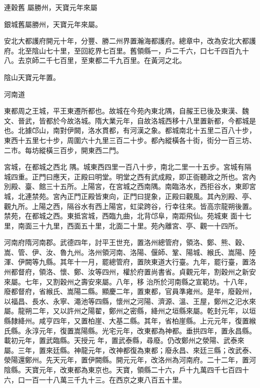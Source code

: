 \begin{pinyinscope}
 連穀舊
 屬勝州，天寶元年來屬



 銀城舊屬勝州，天寶元年來屬。



 安北大都護府開元十年，分豐、勝二州界置瀚海都護府。總章中，改為安北大都護府。北至陰山七十里，至回紇界七百里。舊領縣一，戶二千六，口七千四百九十八。去京師二千七百里，至東都二千九百里。在黃河之北。



 陰山天寶元年置。



 河南道



 東都周之王城，平王東遷所都也。故城在今苑內東北隅，自赧王已後及東漢、魏文、晉武，皆都於今故洛城。隋大業元年，自故洛城西移十八里置新都，今都城是也。北據邙山，南對伊闕，洛水貫都，有河漢之象。都城南北十五里二百八十步，東西十五里七十步，周圍六十九里三百二十步。都內縱橫各十街，街分一百三坊、二市。每坊縱橫三百步，開東西二門。



 宮城，在都城之西北
 隅。城東西四里一百八十步，南北二里一十五步。宮城有隔城四重。正門曰應天，正殿曰明堂。明堂之西有武成殿，即正衙聽政之所也。宮內別殿、臺、館三十五所。上陽宮，在宮城之西南隅。南臨洛水，西拒谷水，東即宮城，北連禁苑。宮內正門正殿皆東向，正門曰提象，正殿曰觀風。其內別殿、亭、觀九所。上陽之西，隔谷水有西上陽宮，虹梁跨谷，行幸往來。皆高宗龍朔後置。禁苑，在都城之西。東抵宮城，西臨九曲，北背邙阜，南距飛仙。苑城東
 面十七里，南面三十九里，西面五十里，北面二十里。苑內離宮、亭、觀一十四所。



 河南府隋河南郡。武德四年，討平王世充，置洛州總管府，領洛、鄭、熊、穀、嵩、管、伊、汝、魯九州。洛州領河南、洛陽、偃師、鞏、陽城、緱氏、嵩陽、陸渾、伊闕等九縣。其年十一月，罷總管府，置陜東道大行臺。九年，罷行臺，置洛州都督府，領洛、懷、鄭、汝等四州，權於府置尚書省。貞觀元年，割穀州之新安來屬。七年，又割穀州之壽安來屬。八年，移
 治所於河南縣之宣範坊。十八年，廢都督府，省緱氏、嵩陽二縣。顯慶二年，置東都，官員準雍州。是年，廢穀州，以福昌、長水、永寧、澠池等四縣，懷州之河陽、濟源、溫、王屋，鄭州之汜水來屬。龍朔二年，又以許州之陽翟，鄭州之密縣，絳州之垣縣來屬。乾封元年，以垣縣隸絳州。咸亨四年，又置柏崖、大基二縣。其年，省柏崖縣。上元元年，復置緱氏縣。永淳元年，復置嵩陽縣。光宅元年，改東都為神都。垂拱四年，置永昌縣。載初元年，置武臨縣。天授元
 年，置武泰縣，尋廢。仍改鄭州之滎陽、武泰來屬。三年，置來廷縣。神龍元年，改神都復為東都；廢永昌、來廷三縣；改武泰、滎陽還鄭州。先天元年，置伊闕縣。開元元年，改洛州為河南府。二十二年，置河陰縣。天寶元年，改東都為東京也。天寶，領縣二十六，戶十九萬四千七百四十六，口一百一十八萬三千九十三。在西京之東八百五十里。




\end{pinyinscope}
